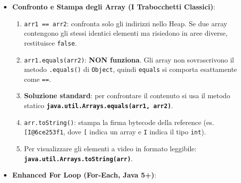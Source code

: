 \documentclass[11pt,a4paper,oneside]{report}
\newcommand{\passthrough}[1]{#1}
\providecommand{\tightlist}{\setlength{\itemsep}{0pt}\setlength{\parskip}{0pt}}
\begin{document}
\begin{itemize}
  \begin{itemize}
  \tightlist
  \item
    Ogni array possiede la proprietà
    \passthrough{\lstinline!public final int length!}.
  \item
    {[}Attenzione{]} \textbf{Distinzione d'esame}: per gli array si
    scrive \passthrough{\lstinline!arr.length!} (\textbf{senza
    parentesi}, è una variabile \passthrough{\lstinline!final!}), mentre
    per le stringhe si invoca il metodo
    \passthrough{\lstinline!str.length()!} (\textbf{con le parentesi}).
  \item
    Se si tenta di leggere \passthrough{\lstinline!arr.length!} su un
    array nullo (\passthrough{\lstinline!arr = null;!}), la JVM lancia
    una \passthrough{\lstinline!NullPointerException!}.
  \end{itemize}
\item
  \textbf{Confronto e Stampa degli Array (I Trabocchetti Classici)}:

  \begin{enumerate}
  \def\labelenumi{\arabic{enumi}.}
  \tightlist
  \item
    \passthrough{\lstinline!arr1 == arr2!}: confronta solo gli indirizzi
    nello Heap. Se due array contengono gli stessi identici elementi ma
    risiedono in aree diverse, restituisce
    \passthrough{\lstinline!false!}.
  \item
    \passthrough{\lstinline!arr1.equals(arr2)!}: \textbf{NON funziona}.
    Gli array non sovrascrivono il metodo
    \passthrough{\lstinline!.equals()!} di
    \passthrough{\lstinline!Object!}, quindi
    \passthrough{\lstinline!equals!} si comporta esattamente come
    \passthrough{\lstinline!==!}.
  \item
    \textbf{Soluzione standard}: per confrontare il contenuto si usa il
    metodo statico
    \textbf{\passthrough{\lstinline!java.util.Arrays.equals(arr1, arr2)!}}.
  \item
    \passthrough{\lstinline!arr.toString()!}: stampa la firma bytecode
    della reference (es. \passthrough{\lstinline![I@6ce253f1!}, dove
    \passthrough{\lstinline![!} indica un array e
    \passthrough{\lstinline!I!} indica il tipo
    \passthrough{\lstinline!int!}).
  \item
    Per visualizzare gli elementi a video in formato leggibile:
    \textbf{\passthrough{\lstinline!java.util.Arrays.toString(arr)!}}.
  \end{enumerate}
\item
  \textbf{Enhanced For Loop (For-Each, Java 5+)}:


\end{itemize}
\end{document}
